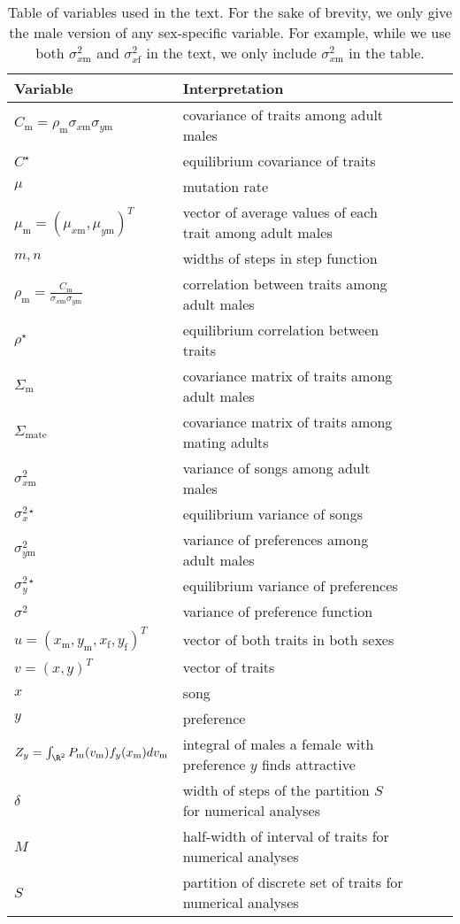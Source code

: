 \documentclass[12pt]{article}
\newcommand{\x}[1]{\text{#1}}
\begin{document}
\begin{table}[tp]
\caption{\label{variables} Table of variables used in the text. For the sake of brevity, we only give the male version of any sex-specific variable. For example, while we use both $\sigma_{x\x{m}}^2$ and $\sigma_{x\x{f}}^2$ in the text, we only include $\sigma_{x\x{m}}^2$ in the table.}
\vspace{5pt}
\begin{tabular}{lllll}
Variable & Interpretation
\\\hline $C_\x{m}=\rho_\x{m}\sigma_{x\x{m}}\sigma_{y\x{m}}$ & covariance of traits among adult males
\\ $C^\star$ & equilibrium covariance of traits
\\ $\mu$ & mutation rate 
\\$\mu_\x{m}=(\mu_{x\x{m}},\mu_{y\x{m}})^T$ & vector of average values of each trait among adult males 
\\$m,n$ & widths of steps in step function 
\\ $\rho_\x{m}=\frac{C_\x{m}}{\sigma_{x\x{m}}\sigma_{y\x{m}}}$ & correlation between traits among adult males
\\ $\rho^\star$ & equilibrium correlation between traits
\\$\Sigma_\x{m}$ & covariance matrix of traits among adult males
\\$\Sigma_\text{mate}$ & covariance matrix of traits among mating adults
\\$\sigma_{x\x{m}}^2$ & variance of songs among adult males
\\$\sigma_{x}^{2\star}$ & equilibrium variance of songs
\\$\sigma_{y\x{m}}^2$ & variance of preferences among adult males
\\$\sigma_y^{2\star}$ & equilibrium variance of preferences
\\$\sigma^2$ & variance of preference function
\\$u=(x_\x{m},y_\x{m},x_\x{f},y_\x{f})^T$ & vector of both traits in both sexes
\\$v=(x,y)^T$ & vector of traits
\\$x$ & song
\\$y$ & preference
\\$Z_y=\int_{\R^2}P_\x{m}(v_\x{m})f_{y}(x_\x{m})dv_\x{m}$ & integral of males a female with preference $y$ finds attractive
\\ $\delta$ & width of steps of the partition $S$ for numerical analyses
\\ $M$ & half-width of interval of traits for numerical analyses
\\ $S$ & partition of discrete set of traits for numerical analyses
\end{tabular}
\end{table}
\end{document}
